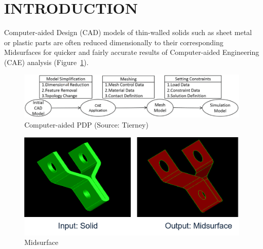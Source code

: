 \documentclass[9pt,academicons]{article}
\begin{document}
%






\section{INTRODUCTION}
Computer-aided Design (CAD) models of thin-walled solids such as sheet metal or plastic parts are often reduced dimensionally to their corresponding Midsurfaces for quicker and fairly accurate results of Computer-aided Engineering (CAE) analysis (Figure~\ref{fig_cadcaeworkflow}).  

	\begin{figure} [!h]
		\centering
		\includegraphics[width=\linewidth,keepaspectratio]{images/Midcurve2}
		\caption{Computer-aided PDP (Source: Tierney\cite{Tierney2013})}
		\label{fig_cadcaeworkflow}
	\end{figure}
	



	\begin{figure} [!h]
		\centering
		\includegraphics[width=0.8\linewidth,keepaspectratio]{images/Midcurve5}
		\caption{Midsurface}
		\label{fig_midsurface}
	\end{figure}
	
\end{document}
